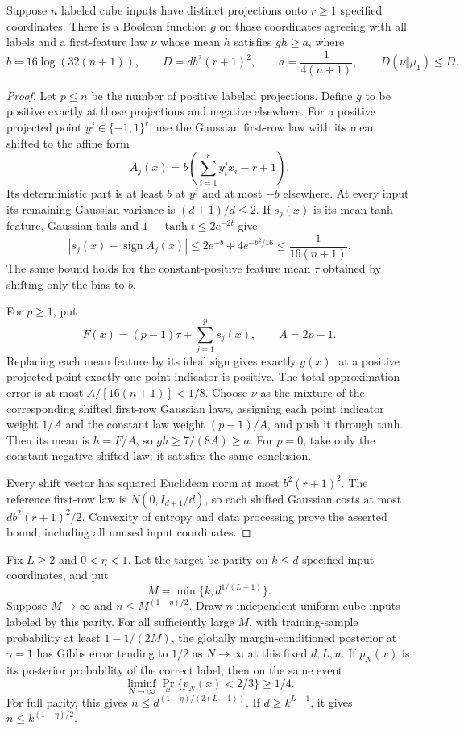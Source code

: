 \begin{lemma}
\label{lem:critical-projected-memorizer}
Suppose $n$ labeled cube inputs have distinct projections onto $r\ge1$
specified coordinates. There is a Boolean function $g$ on those
coordinates agreeing with all labels and a first-feature law $\nu$
whose mean $h$ satisfies $gh\ge a$, where
\[
 b=16\log(32(n+1)),\qquad
 D=d b^2(r+1)^2,\qquad a=\frac1{4(n+1)},
 \qquad D(\nu\Vert\mu_1)\le D.
\]
\end{lemma}

\begin{proof}
Let $p\le n$ be the number of positive labeled projections. Define $g$
to be positive exactly at those projections and negative elsewhere.
For a positive projected point $y^j\in\{-1,1\}^r$, use the Gaussian
first-row law with its mean shifted to the affine form
\[
 A_j(x)=b\left(\sum_{i=1}^r y_i^j x_i-r+1\right).
\]
Its deterministic part is at least $b$ at $y^j$ and at most $-b$
elsewhere. At every input its remaining Gaussian variance is
$(d+1)/d\le2$. If $s_j(x)$ is its mean tanh feature, Gaussian tails
and $1-\tanh t\le2e^{-2t}$ give
\[
 |s_j(x)-\operatorname{sign}A_j(x)|
 \le2e^{-b}+4e^{-b^2/16}
 \le\frac1{16(n+1)}.
\]
The same bound holds for the constant-positive feature mean $\tau$
obtained by shifting only the bias to $b$.

For $p\ge1$, put
\[
 F(x)=(p-1)\tau+\sum_{j=1}^p s_j(x),\qquad A=2p-1.
\]
Replacing each mean feature by its ideal sign gives exactly $g(x)$:
at a positive projected point exactly one point indicator is positive.
The total approximation error is at most
$A/[16(n+1)]<1/8$. Choose $\nu$ as the mixture of the corresponding
shifted first-row Gaussian laws, assigning each point indicator weight
$1/A$ and the constant law weight $(p-1)/A$, and push it through tanh.
Then its mean is $h=F/A$, so $gh\ge7/(8A)\ge a$.
For $p=0$, take only the constant-negative shifted law; it satisfies
the same conclusion.

Every shift vector has squared Euclidean norm at most
$b^2(r+1)^2$. The reference first-row law is
$N(0,I_{d+1}/d)$, so each shifted Gaussian costs at most
$d b^2(r+1)^2/2$. Convexity of entropy and data processing prove
the asserted bound, including all unused input coordinates.
\end{proof}

\begin{theorem}
\label{thm:critical-polynomial-sample-lower}
Fix $L\ge2$ and $0<\eta<1$. Let the target be parity on $k\le d$
specified input coordinates, and put
\[
 M=\min\{k,d^{1/(L-1)}\}.
\]
Suppose $M\to\infty$ and $n\le M^{(1-\eta)/2}$. Draw $n$ independent
uniform cube inputs labeled by this parity. For all sufficiently large
$M$, with training-sample probability at least $1-1/(2M)$, the globally
margin-conditioned posterior at
$\gamma=1$ has Gibbs error tending to $1/2$ as $N\to\infty$ at
this fixed $d,L,n$. If $p_N(x)$ is its posterior probability of the
correct label, then on the same event
\[
 \liminf_{N\to\infty}\Pr_x\{p_N(x)<2/3\}\ge1/4.
\]
For full parity, this gives $n\le d^{(1-\eta)/(2(L-1))}$. If
$d\ge k^{L-1}$, it gives $n\le k^{(1-\eta)/2}$.
\end{theorem}

